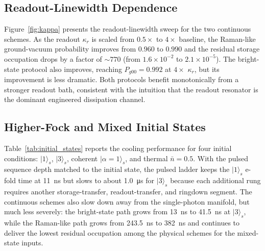 \documentclass[aps,pra,twocolumn,reprint,floatfix,amsmath,amssymb]{revtex4-2}
\begin{document}
\subsection{Readout-Linewidth Dependence}

Figure~\ref{fig:kappa} presents the readout-linewidth sweep for the two continuous schemes.
As the readout $\kappa_r$ is scaled from $0.5\times$ to $4\times$ baseline, the Raman-like ground-vacuum probability improves from $0.960$ to $0.990$ and the residual storage occupation drops by a factor of ${\sim}770$ (from $1.6 \times 10^{-2}$ to $2.1 \times 10^{-5}$).
The bright-state protocol also improves, reaching $P_{g00} = 0.992$ at $4\times$ $\kappa_r$, but its improvement is less dramatic.
Both protocols benefit monotonically from a stronger readout bath, consistent with the intuition that the readout resonator is the dominant engineered dissipation channel.

\subsection{Higher-Fock and Mixed Initial States}

Table~\ref{tab:initial_states} reports the cooling performance for four initial conditions: $|1\rangle_s$, $|3\rangle_s$, coherent $|\alpha{=}1\rangle_s$, and thermal $\bar{n} = 0.5$.
With the pulsed sequence depth matched to the initial state, the pulsed ladder keeps the $|1\rangle_s$ e-fold time at \SI{11}{ns} but slows to about \SI{1.0}{\micro\second} for $|3\rangle_s$ because each additional rung requires another storage-transfer, readout-transfer, and ringdown segment.
The continuous schemes also slow down away from the single-photon manifold, but much less severely: the bright-state path grows from \SI{13}{ns} to \SI{41.5}{ns} at $|3\rangle_s$, while the Raman-like path grows from \SI{243.5}{ns} to \SI{382}{ns} and continues to deliver the lowest residual occupation among the physical schemes for the mixed-state inputs.
\end{document}
